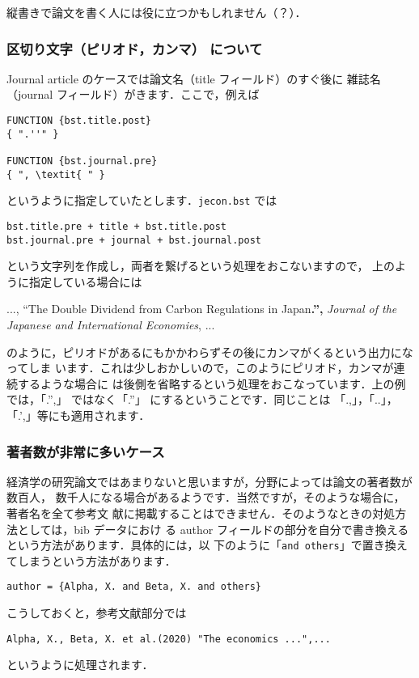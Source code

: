 \documentclass[article]{jlreq}
\begin{document}
縦書きで論文を書く人には役に立つかもしれません（？）．

\subsubsection{区切り文字（ピリオド，カンマ） について}

Journal article のケースでは論文名（title フィールド）のすぐ後に
雑誌名（journal フィールド）がきます．ここで，例えば
\begin{screen}
\begin{verbatim}
FUNCTION {bst.title.post}
{ ".''" }

FUNCTION {bst.journal.pre}
{ ", \textit{ " }
\end{verbatim}
\end{screen}
というように指定していたとします．\texttt{jecon.bst} では
\begin{center}
\verb|bst.title.pre + title + bst.title.post| \\
\verb|bst.journal.pre + journal + bst.journal.post|
\end{center}
という文字列を作成し，両者を繋げるという処理をおこないますので，
上のように指定している場合には
\begin{flushleft}
 ..., ``The Double Dividend from Carbon Regulations in Japan\textbf{.'',} \textit{Journal of the Japanese and International Economies}, ...
\end{flushleft}
のように，ピリオドがあるにもかかわらずその後にカンマがくるという出力になってしま
います．これは少しおかしいので，このようにピリオド，カンマが連続するような場合に
は後側を省略するという処理をおこなっています．上の例では，「.'',」 ではなく「.''」
にするということです．同じことは 「.,」，「..」，「.',」等にも適用されます．

\subsubsection{著者数が非常に多いケース}

経済学の研究論文ではあまりないと思いますが，分野によっては論文の著者数が数百人，
数千人になる場合があるようです．当然ですが，そのような場合に，著者名を全て参考文
献に掲載することはできません．そのようなときの対処方法としては，bib データにおけ
る author フィールドの部分を自分で書き換えるという方法があります．具体的には，以
下のように「\texttt{and others}」で置き換えてしまうという方法があります．
\begin{screen}
\begin{verbatim}
author = {Alpha, X. and Beta, X. and others}
\end{verbatim}
\end{screen}
こうしておくと，参考文献部分では
\begin{screen}
\begin{verbatim}
Alpha, X., Beta, X. et al.(2020) "The economics ...",...
\end{verbatim}
\end{screen}
というように処理されます．
\end{document}

